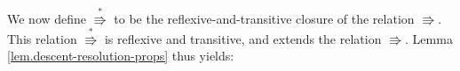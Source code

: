 \documentclass[12pt]{article}
\theoremstyle{plain}
\theoremstyle{definition}
\newenvironment{proof}[1][Proof]{\noindent\textbf{#1.} }{\ \rule{0.5em}{0.5em}}
\def\BenignTables{{\operatorname{BT}^{12}\left(  \lambda/\mu\right)}}
\begin{document}





We now define $\overset{\ast}{\Rrightarrow}$ to be the
reflexive-and-transitive closure of the relation $\Rrightarrow$.
This relation $\overset{\ast}{\Rrightarrow}$ is reflexive and transitive,
and extends the relation $\Rrightarrow$.
Lemma \ref{lem.descent-resolution-props} thus yields:
\end{document}
